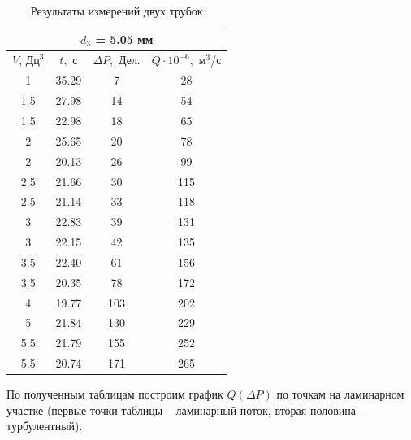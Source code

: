 \documentclass[a4paper,12pt]{article}
\theoremstyle{definition}
\begin{document}
\begin{table}[H]
\begin{minipage}{.49\linewidth}
			\centering
			\begin{tabular}{|c|c|c|c|}
				\hline
				\multicolumn{4}{|c|}{$d_3$ = 5.05 мм }\\ \hline
				$V$, $\text{Дц}^3$& $t,$ с&$\Delta P,$ Дел.  & $Q\cdot 10^{-6},$ $\text{м}^3$/с\\ \hline
				1 & 35.29 & 7 & 28 \\ \hline
				1.5 & 27.98 & 14 & 54 \\ \hline
				1.5 & 22.98 & 18 & 65 \\ \hline
				2 & 25.65 & 20 & 78 \\ \hline
				2 & 20.13 & 26 & 99 \\ \hline
				2.5 & 21.66 & 30 & 115 \\ \hline
				2.5 & 21.14 & 33 & 118 \\ \hline
				3 & 22.83 & 39 & 131 \\ \hline \hline
				3 & 22.15 & 42 & 135 \\ \hline
				3.5 & 22.40 & 61 & 156 \\ \hline
				3.5 & 20.35 & 78 & 172 \\ \hline
				4 & 19.77 & 103 & 202 \\ \hline
				5 & 21.84 & 130 & 229 \\ \hline
				5.5 & 21.79 & 155 & 252 \\ \hline
				5.5 & 20.74 & 171 & 265 \\ \hline
			\end{tabular}
		\end{minipage}
		\egroup
		\caption{Результаты измерений двух трубок}
		\label{lowp}
	\end{table}  

	По полученным таблицам построим график $Q(\Delta P)$ по точкам на ламинарном участке (первые точки таблицы -- ламинарный поток, вторая половина -- турбулентный).
	
\end{document}
